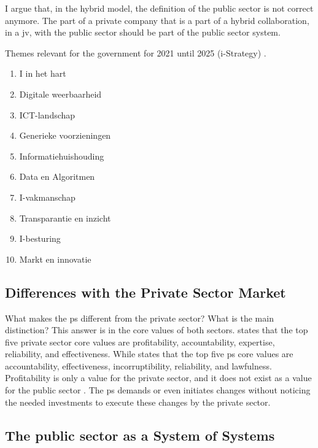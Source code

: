 I argue that, in the hybrid model, the definition of the public sector is not correct anymore. The part of a private company that is a part of a hybrid collaboration, in a \gls{jv}, with the public sector should be part of the public sector system.

Themes relevant for the government for 2021 until 2025 (i-Strategy) \parencite{Digitaleoverheid}.

\begin{enumerate}
	\item{I in het hart}
	\item{Digitale weerbaarheid}
	\item{ICT-landschap}
	\item{Generieke voorzieningen}
	\item{Informatiehuishouding}
	\item{Data en Algoritmen}
	\item{I-vakmanschap}
	\item{Transparantie en inzicht}
	\item{I-besturing}
	\item{Markt en innovatie}
\end{enumerate}

\subsection{Differences with the Private Sector Market}
\label{sub:tbdifferenceprivatesector}
What makes the \gls{ps} different from the private sector? What is the main distinction? This answer is in the core values of both sectors. \Textcite{Wal2008} states that the top five private sector core values are profitability, accountability, expertise, reliability, and effectiveness. While \textcite{Wal2008} states that the top five \gls{ps} core values are accountability, effectiveness, incorruptibility, reliability, and lawfulness. Profitability is only a value for the private sector, and it does not exist as a value for the public sector \parencite{Wal2008}. The \gls{ps} demands or even initiates changes without noticing the needed investments to execute these changes by the private sector.

\subsection{The public sector as a System of Systems}
\label{sub:tbpssystemofsystems}

